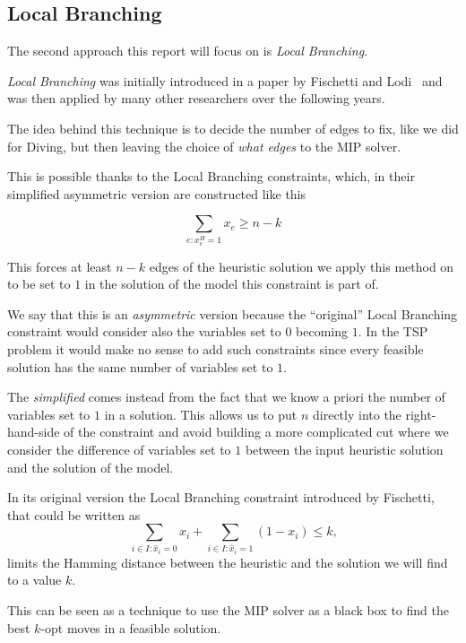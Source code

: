 \documentclass{article}
\begin{document}
\subsection{Local Branching}
The second approach this report will focus on is \textit{Local Branching}.

\textit{Local Branching} was initially introduced in a paper by Fischetti and Lodi~\cite{fischetti2003local} and was then applied by many other researchers over the following
years.

The idea behind this technique is to decide the number of edges to fix, like we did for Diving,
but then leaving the choice of \textit{what edges} to the MIP solver.

This is possible thanks to the Local Branching constraints, which, in their simplified
asymmetric version are constructed like this

\begin{equation*}
        \sum_{e : x_{e}^{H}=1} x_{e} \geq n - k
\end{equation*}

This forces at least $n-k$ edges of the heuristic solution we apply this method on to be
set to $1$ in the solution of the model this constraint is part of.

We say that this is an \textit{asymmetric} version because the ``original'' Local Branching
constraint would consider also the variables set to $0$ becoming $1$.
In the TSP problem it would make no sense to add such constraints since every feasible
solution has the same number of variables set to $1$.

The \textit{simplified} comes instead from the fact that we know a priori the number of
variables set to $1$ in a solution. This allows us to put $n$ directly into the right-hand-side
of the constraint and avoid building a more complicated cut where we consider the difference
of variables set to $1$ between the input heuristic solution and the solution of the model.

In its original version the Local Branching constraint introduced by Fischetti, that
could be written as
\begin{equation*}
\sum_{i \in I: \hat{x}_i = 0} x_i + \sum_{i \in I: \hat{x}_i = 1} (1 - x_i) \leq k \text{,}
\end{equation*}
limits the Hamming distance between the heuristic and the solution we will find to
a value $k$.

This can be seen as a technique to use the MIP solver as a black box to find
the best $k$-opt moves in a feasible solution.
\end{document}
